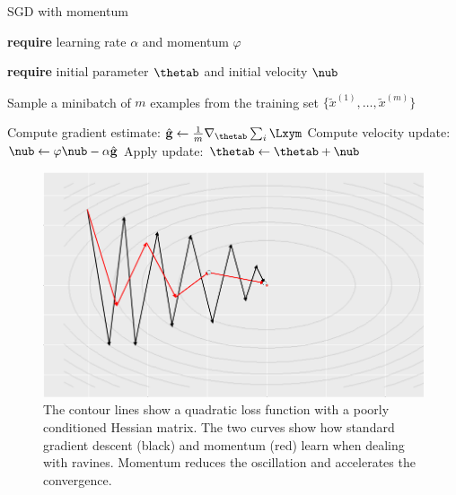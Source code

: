 \begin{vbframe}{SGD with momentum}
  \begin{algorithm}[H]
  \small
    \caption{Stochastic gradient descent with momentum}
    \begin{algorithmic}[1]
    \State \textbf{require} learning rate $\alpha$ and momentum $\varphi$ \strut
    \State \textbf{require} initial parameter $\thetab$ and initial velocity $\nub$ \strut
        \State \parbox[t]{\dimexpr\linewidth-\algorithmicindent}{Sample a minibatch of $m$ examples from the training set $\{\tilde{x}^{(1)},\dots,\tilde{x}^{(m)}\}$}
        \State Compute gradient estimate: $\hat{\mathbf{g}} \leftarrow  \frac{1}{m} \nabla_{\thetab} \sum_{i} \Lxym$
        \State Compute velocity update: $\nub \leftarrow \varphi \nub - \alpha \hat{\mathbf{g}}$
        \State Apply update: $\thetab \leftarrow \thetab + \nub$
      \EndWhile
    \end{algorithmic}
  \end{algorithm}
  
\framebreak
  
  \begin{figure}
  \captionsetup{font=footnotesize,labelfont=footnotesize, labelfont = bf}
  \centering
    \includegraphics[height = 6 cm, width = 10 cm]{plots/momentum.png}
    \caption{The contour lines show a quadratic loss function with a poorly conditioned Hessian matrix. The two curves show how standard gradient descent (black) and momentum (red) learn when dealing with ravines. Momentum reduces the oscillation and accelerates the convergence.}
  \end{figure}
\end{vbframe}

